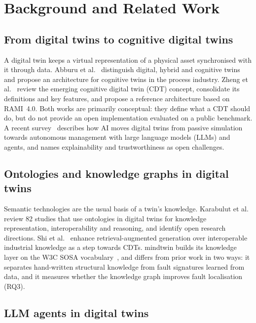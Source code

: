 \section{Background and Related Work}
\label{sec:related-work}

\subsection{From digital twins to cognitive digital twins}

A digital twin keeps a virtual representation of a physical asset synchronised with it through
data. Abburu et al.~\citep{abburu2020cognitwin} distinguish digital, hybrid and cognitive twins
and propose an architecture for cognitive twins in the process industry. Zheng et
al.~\citep{zheng2022cdt} review the emerging cognitive digital twin (CDT) concept, consolidate its
definitions and key features, and propose a reference architecture based on RAMI~4.0. Both works
are primarily conceptual: they define what a CDT should do, but do not provide an open
implementation evaluated on a public benchmark. A recent survey~\citep{zhou2026dtai} describes how
AI moves digital twins from passive simulation towards autonomous management with large language
models (LLMs) and agents, and names explainability and trustworthiness as open challenges.

\subsection{Ontologies and knowledge graphs in digital twins}

Semantic technologies are the usual basis of a twin's knowledge. Karabulut et
al.~\citep{karabulut2024ontologies} review 82 studies that use ontologies in digital twins for
knowledge representation, interoperability and reasoning, and identify open research directions.
Shi et al.~\citep{shi2025rag} enhance retrieval-augmented generation over interoperable industrial
knowledge as a step towards CDTs. mindtwin builds its knowledge layer on the W3C SOSA
vocabulary~\citep{w3c2017sosa}, and differs from prior work in two ways: it separates hand-written
structural knowledge from fault signatures learned from data, and it measures whether the
knowledge graph improves fault localisation (RQ3).

\subsection{LLM agents in digital twins}

